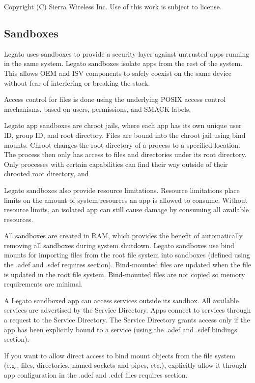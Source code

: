  Copyright (C) Sierra Wireless Inc. Use of this work is subject to license. \hypertarget{basicSecuritySandbox}{}\subsection{Sandboxes}\label{basicSecuritySandbox}
Legato uses sandboxes to provide a security layer against untrusted apps running in the same system. Legato sandboxes isolate apps from the rest of the system. This allows O\+E\+M and I\+S\+V components to safely coexist on the same device without fear of interfering or breaking the stack.

Access control for files is done using the underlying P\+O\+S\+I\+X access control mechanisms, based on users, permissions, and S\+M\+A\+C\+K labels.

Legato app sandboxes are chroot jails, where each app has its own unique user I\+D, group I\+D, and root directory. Files are bound into the chroot jail using bind mounts. Chroot changes the root directory of a process to a specified location. The process then only has access to files and directories under its root directory. Only processes with certain capabilities can find their way outside of their {\ttfamily chrooted} root directory, and

Legato sandboxes also provide resource limitations. Resource limitations place limits on the amount of system resources an app is allowed to consume. Without resource limits, an isolated app can still cause damage by consuming all available resources.

All sandboxes are created in R\+A\+M, which provides the benefit of automatically removing all sandboxes during system shutdown. Legato sandboxes use bind mounts for importing files from the root file system into sandboxes (defined using the {\ttfamily }.adef and {\ttfamily }.sdef {\ttfamily requires} section). Bind-\/mounted files are updated when the file is updated in the root file system. Bind-\/mounted files are not copied so memory requirements are minimal.

A Legato sandboxed app can access services outside its sandbox. All available services are advertised by the Service Directory. Apps connect to services through a request to the Service Directory. The Service Directory grants access only if the app has been explicitly bound to a service (using the {\ttfamily }.adef and {\ttfamily }.sdef {\ttfamily bindings} section).

If you want to allow direct access to bind mount objects from the file system (e.\+g., files, directories, named sockets and pipes, etc.), explicitly allow it through app configuration in the {\ttfamily  .adef } and {\ttfamily  .cdef }files {\ttfamily requires} section.




